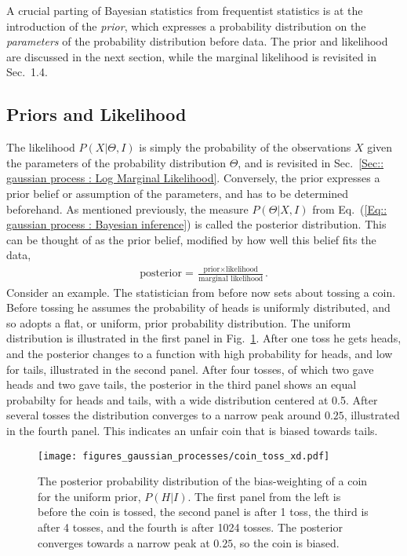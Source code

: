 \documentclass[twoside,english]{uiofysmaster}
\begin{document}
A crucial parting of Bayesian statistics from frequentist statistics is at the introduction of the \textit{prior}, which expresses a probability distribution on the \textit{parameters} of the probability distribution before data. The prior and likelihood are discussed in the next section, while the marginal likelihood is revisited in Sec.~1.4.

\subsection{Priors and Likelihood}\label{Sec:: gaussian process : Priors and Likelihood}

The likelihood $P(X |\Theta, I)$ is simply the probability of the observations $X$ given the parameters of the probability distribution $\Theta$, and is revisited in Sec.~\ref{Sec:: gaussian process : Log Marginal Likelihood}. Conversely, the prior expresses a prior belief or assumption of the parameters, and has to be determined beforehand. As mentioned previously, the measure $P(\Theta | X , I)$ from Eq.~(\ref{Eq:: gaussian process : Bayesian inference}) is called the posterior distribution. This can be thought of as the prior belief, modified by how well this belief fits the data,
\begin{align*}
\text{posterior} = \frac{\text{prior} \times \text{likelihood}}{\text{marginal likelihood}}.
\end{align*}
Consider an example. The statistician from before now sets about tossing a coin. Before tossing he assumes the probability of heads is uniformly distributed, and so adopts a flat, or uniform, prior probability distribution. The uniform distribution is illustrated in the first panel in Fig.~\ref{Fig:: gaussian process : Dice throw }. After one toss he gets heads, and the posterior changes to a function with high probability for heads, and low for tails, illustrated in the second panel. After four tosses, of which two gave heads and two gave tails, the posterior in the third panel shows an equal probabilty for heads and tails, with a wide distribution centered at 0.5. After several tosses the distribution converges to a narrow peak around $0.25$, illustrated in the fourth panel. This indicates an unfair coin that is biased towards tails.

\begin{figure}
\texttt{[image: figures\_gaussian\_processes/coin\_toss\_xd.pdf]}
\caption{The posterior probability distribution of the bias-weighting of a coin for the uniform prior, $P(H|I)$. The first panel from the left is before the coin is tossed, the second panel is after 1 toss, the third is after 4 tosses, and the fourth is after 1024 tosses. The posterior converges towards a narrow peak at $0.25$, so the coin is biased.}
\label{Fig:: gaussian process : Dice throw }
\end{figure}
\end{document}
